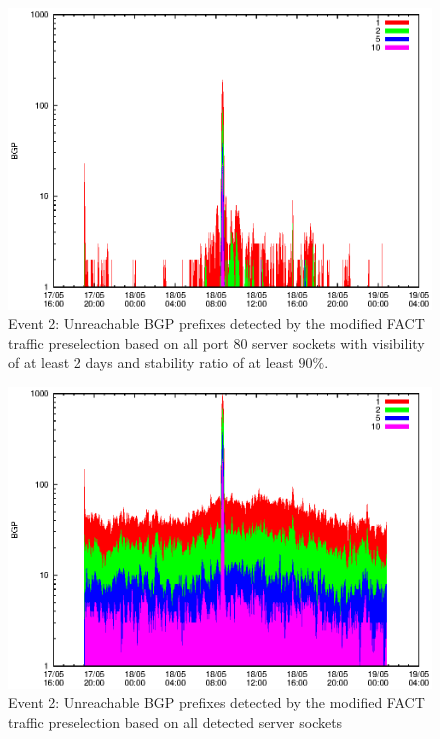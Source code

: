 \begin{figure}
	[p] \centering 
	\includegraphics[width=0.75\linewidth]{images/events/2010_05_18/bgp_log_port80_Set_stab_9_vts_2.eps}
	\caption{Event 2: Unreachable BGP prefixes detected by the modified FACT traffic preselection based on all port 80 server sockets with visibility of at least 2 days and stability ratio of at least $90\%$.} 
	\label{fig:TIER1_FACT_allSES80VTS2STAB9} 
\end{figure}

\begin{figure}
	[p] \centering 
	\includegraphics[width=0.75\linewidth]{images/events/2010_05_18/bgp_log_all_external.eps}
	\caption{Event 2: Unreachable BGP prefixes detected by the modified FACT traffic preselection based on all detected server sockets} 
	\label{fig:TIER1_FACT_allSES} 
\end{figure}


